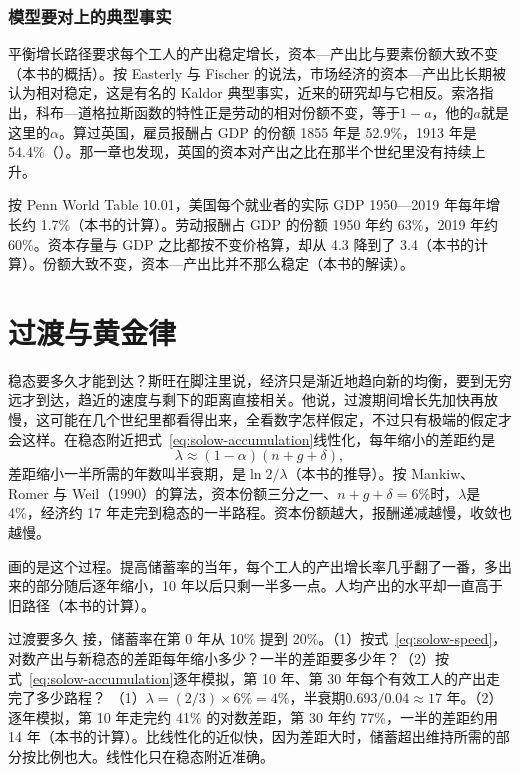 \subsubsection{模型要对上的典型事实}

平衡增长路径要求每个工人的产出稳定增长，资本—产出比与要素份额大致不变（本书的概括）。按 Easterly 与 Fischer 的说法，市场经济的资本—产出比长期被认为相对稳定，这是有名的 Kaldor 典型事实，近来的研究却与它相反\cite{ef1995}。索洛指出，科布—道格拉斯函数的特性正是劳动的相对份额不变，等于$1-a$，他的$a$就是这里的$\alpha$\cite{solow1956}。算过英国，雇员报酬占 GDP 的份额 1855 年是 52.9\%，1913 年是 54.4\%（）。那一章也发现，英国的资本对产出之比在那半个世纪里没有持续上升。

按 Penn World Table 10.01，美国每个就业者的实际 GDP 1950—2019 年每年增长约 1.7\%（本书的计算）\cite{pwt1001}。劳动报酬占 GDP 的份额 1950 年约 63\%，2019 年约 60\%\cite{pwt1001}。资本存量与 GDP 之比都按不变价格算，却从 4.3 降到了 3.4（本书的计算）。份额大致不变，资本—产出比并不那么稳定（本书的解读）。

\section{过渡与黄金律}\label{sec:solow-transition}

稳态要多久才能到达？斯旺在脚注里说，经济只是渐近地趋向新的均衡，要到无穷远才到达，趋近的速度与剩下的距离直接相关\cite{swan1956}。他说，过渡期间增长先加快再放慢，这可能在几个世纪里都看得出来，全看数字怎样假定，不过只有极端的假定才会这样\cite{swan1956}。在稳态附近把式~\eqref{eq:solow-accumulation}线性化，每年缩小的差距约是
\begin{equation}
\lambda\approx(1-\alpha)(n+g+\delta),\label{eq:solow-speed}
\end{equation}
差距缩小一半所需的年数叫半衰期，是$\ln 2/\lambda$（本书的推导）。按 Mankiw、Romer 与 Weil（1990）的算法，资本份额三分之一、$n+g+\delta=6\%$时，$\lambda$是 4\%，经济约 17 年走完到稳态的一半路程\cite{mrw1990}。资本份额越大，报酬递减越慢，收敛也越慢。

画的是这个过程。提高储蓄率的当年，每个工人的产出增长率几乎翻了一番，多出来的部分随后逐年缩小，10 年以后只剩一半多一点。人均产出的水平却一直高于旧路径（本书的计算）。

\begin{example}{过渡要多久}\label{ex:solow-transition}
接，储蓄率在第 0 年从 10\% 提到 20\%。（1）按式~\eqref{eq:solow-speed}，对数产出与新稳态的差距每年缩小多少？一半的差距要多少年？（2）按式~\eqref{eq:solow-accumulation}逐年模拟，第 10 年、第 30 年每个有效工人的产出走完了多少路程？
\solution
（1）$\lambda=(2/3)\times6\%=4\%$，半衰期$0.693/0.04\approx17$ 年。（2）逐年模拟，第 10 年走完约 41\% 的对数差距，第 30 年约 77\%，一半的差距约用 14 年（本书的计算）。比线性化的近似快，因为差距大时，储蓄超出维持所需的部分按比例也大。线性化只在稳态附近准确。
\end{example}


